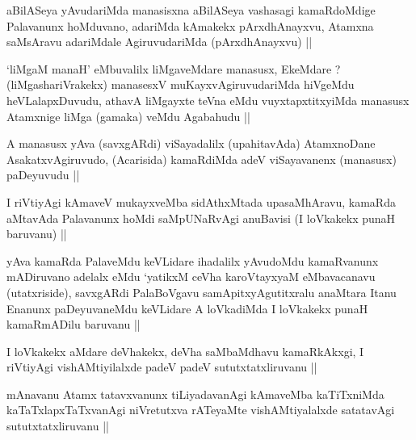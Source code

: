 \begin{artha}
aBilASeya yAvudariMda manasisxna aBilASeya vashasagi kamaRdoMdige
Palavanunx hoMduvano, adariMda kAmakekx pArxdhAnayxvu, Atamxna
saMsAravu adariMdale AgiruvudariMda (pArxdhAnayxvu) ||
\end{artha}


\begin{artha}
`liMgaM manaH' eMbuvalilx liMgaveMdare manasusx, EkeMdare ?
  (liMgashariVrakekx) manasesxV muKayxvAgiruvudariMda hiVgeMdu
  heVLalapxDuvudu, athavA liMgayxte teVna eMdu vuyxtapxtitxyiMda
  manasusx Atamxnige liMga (gamaka) veMdu Agabahudu ||
\end{artha}

\begin{artha}
A manasusx yAva (savxgARdi) viSayadalilx (upahitavAda) AtamxnoDane
AsakatxvAgiruvudo, (Acarisida) kamaRdiMda adeV viSayavanenx (manasusx)
paDeyuvudu ||
\end{artha}


\begin{artha}
I riVtiyAgi kAmaveV mukayxveMba sidAthxMtada upasaMhAravu, kamaRda
aMtavAda Palavanunx hoMdi saMpUNaRvAgi anuBavisi (I loVkakekx punaH
baruvanu) ||
\end{artha}


\begin{artha}
yAva kamaRda PalaveMdu keVLidare ihadalilx yAvudoMdu kamaRvanunx
mADiruvano adelalx eMdu `yatikxM ceVha karoVtayxyaM eMbavacanavu
(utatxriside), savxgARdi PalaBoVgavu samApitxyAgutitxralu anaMtara
Itanu Enanunx paDeyuvaneMdu keVLidare A loVkadiMda I loVkakekx punaH
kamaRmADilu baruvanu ||
\end{artha}


\begin{artha}
I loVkakekx aMdare deVhakekx, deVha saMbaMdhavu kamaRkAkxgi, I
riVtiyAgi vishAMtiyilalxde padeV padeV sututxtatxliruvanu || 
\end{artha}


\begin{artha}
mAnavanu Atamx tatavxvanunx tiLiyadavanAgi kAmaveMba kaTiTxniMda
kaTaTxlapxTaTxvanAgi niVretutxva rATeyaMte vishAMtiyalalxde satatavAgi
sututxtatxliruvanu ||
\end{artha}


